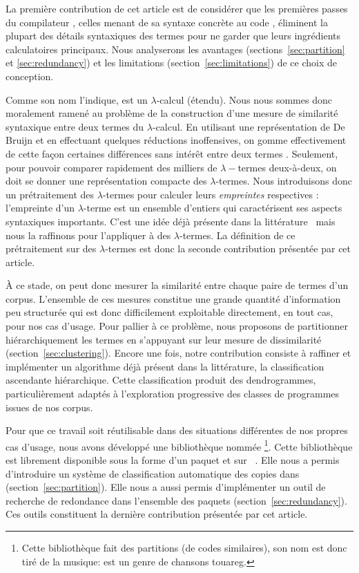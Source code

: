 La première contribution de cet article est de considérer que les
premières passes du compilateur {\OCaml}, celles menant de sa syntaxe
concrète au code {\LambdaCode}, éliminent la plupart des détails
syntaxiques des termes {\OCaml} pour ne garder que leurs ingrédients
calculatoires principaux. Nous analyserons les avantages
(sections~\ref{sec:partition} et \ref{sec:redundancy}) et les
limitations (section~\ref{sec:limitations}) de ce choix de conception.

Comme son nom l'indique, {\LambdaCode} est un $\lambda$-calcul
(étendu). Nous nous sommes donc moralement ramené au problème de la
construction d'une mesure de similarité syntaxique entre deux termes
du $\lambda$-calcul. En utilisant une représentation de De Bruijn et
en effectuant quelques réductions inoffensives, on gomme effectivement
de cette façon certaines différences sans intérêt entre deux termes
{\OCaml}. Seulement, pour pouvoir comparer rapidement des milliers de
$\lambda-$termes deux-à-deux, on doit se donner une représentation
compacte des $\lambda$-termes. Nous introduisons donc un prétraitement
des $\lambda$-termes pour calculer leurs \textit{empreintes}
respectives : l'empreinte d'un $\lambda$-terme est un ensemble
d'entiers qui caractérisent ses aspects syntaxiques importants. C'est
une idée déjà présente dans la
littérature~\cite{chilowicz:hal-00627811} mais nous la raffinons pour
l'appliquer à des $\lambda$-termes.  La définition de ce prétraitement
sur des $\lambda$-termes est donc la seconde contribution présentée
par cet article.

À ce stade, on peut donc mesurer la similarité entre chaque paire de
termes d'un corpus. L'ensemble de ces mesures constitue une grande
quantité d'information peu structurée qui est donc difficilement
exploitable directement, en tout cas, pour nos cas d'usage. Pour
pallier à ce problème, nous proposons de partitionner hiérarchiquement
les termes en s'appuyant sur leur mesure de dissimilarité
(section~\ref{sec:clustering}). Encore une fois, notre contribution
consiste à raffiner et implémenter un algorithme déjà présent dans la
littérature, la classification ascendante hiérarchique. Cette
classification produit des dendrogrammes, particulièrement adaptés à
l'exploration progressive des classes de programmes issues de nos
corpus.

Pour que ce travail soit réutilisable dans des situations différentes
de nos propres cas d'usage, nous avons développé une bibliothèque
nommée {\Asak}\footnote{Cette bibliothèque fait des partitions (de
codes similaires), son nom est donc tiré de la musique: {\Asak} est un
genre de chansons touareg.}.  Cette bibliothèque est librement
disponible sous la forme d'un paquet {\Opam} et sur
{\GitHub}~\cite{asak}.  Elle nous a permis d'introduire un système de
classification automatique des copies dans
{\LearnOCaml}~\cite{learnocaml} (section~\ref{sec:partition}). Elle
nous a aussi permis d'implémenter un outil de recherche de redondance
dans l'ensemble des paquets {\Opam}
(section~\ref{sec:redundancy}). Ces outils constituent la dernière
contribution présentée par cet article.

